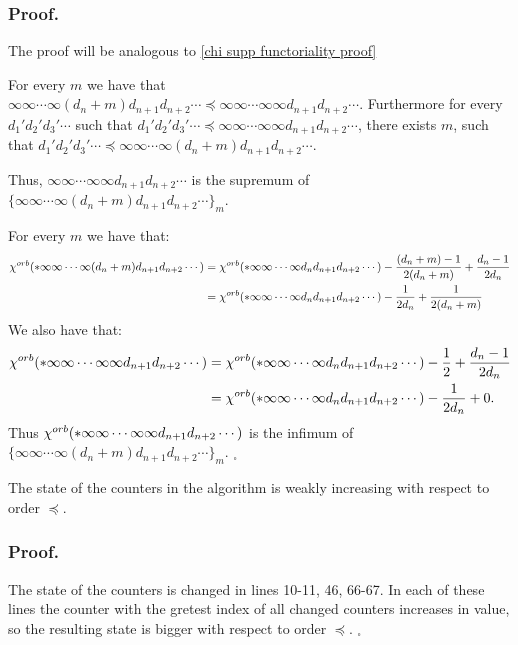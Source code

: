 \subsubsection{Proof.}
The proof will be analogous to \ref{chi supp functoriality proof}

For every $m$ we have that 
$\infty\infty\cdots\infty(d_n+m)d_{n+1}d_{n+2}\cdots\preceq
\infty\infty\cdots\infty \infty d_{n+1} d_{n+2}\cdots$. Furthermore for 
every $d_1'd_2'd_3'\cdots$ such that 
$d_1'd_2'd_3'\cdots\preceq \infty\infty\cdots\infty \infty d_{n+1} d_{n+2}\cdots$, there 
exists $m$, such that 
$d_1'd_2'd_3' \cdots\preceq\infty\infty\cdots\infty(d_n+m)d_{n+1}d_{n+2}\cdots$. 

Thus, $\infty\infty\cdots\infty \infty d_{n+1} d_{n+2}\cdots$ 
is the supremum of $\{\infty\infty\cdots\infty (d_n+m) d_{n+1} d_{n+2}\cdots\}_m$.

For every $m$ we have that: 
\begin{align}
{\chi^{orb}(*\infty\infty\cdots\infty (d_n+m) d_{n+1} d_{n+2}\cdots)} &= 
{\chi^{orb}(*\infty\infty\cdots\infty d_n d_{n+1} d_{n+2}\cdots)} 
- \frac{(d_n+m)-1}{2(d_n+m)} + \frac{d_n-1}{2d_n} \notag\\ 
&= {\chi^{orb}(*\infty\infty\cdots\infty d_n d_{n+1} d_{n+2}\cdots)} - 
\frac{1}{2d_n} + \frac{1}{2(d_n+m)}
\end{align}
We also have that:
\begin{align}
{\chi^{orb}(*\infty\infty\cdots\infty \infty d_{n+1} d_{n+2}\cdots)} &= 
{\chi^{orb}(*\infty\infty\cdots\infty d_n d_{n+1} d_{n+2}\cdots)} 
- \frac{1}{2} + \frac{d_n-1}{2d_n} \notag\\ 
&= {\chi^{orb}(*\infty\infty\cdots\infty d_n d_{n+1} d_{n+2}\cdots)} - \frac{1}{2d_n} + 0.
\end{align}
Thus 
${\chi^{orb}(*\infty\infty\cdots\infty \infty d_{n+1} d_{n+2}\cdots)}$ is the infimum of 
$\{\infty\infty\cdots\infty (d_n+m) d_{n+1} d_{n+2}\cdots\}_m$.
$_\square$
\begin{lemma}
The state of the counters in the algorithm is weakly increasing with respect to order $\preceq$. 
\end{lemma}
\subsubsection{Proof.}
The state of the counters is changed in lines 10-11, 46, 66-67. In each of these lines 
the counter with the gretest index of all changed counters increases in value, so 
the resulting state is bigger with respect to order $\preceq$. $_\square$

